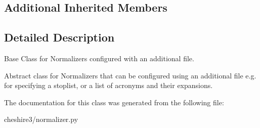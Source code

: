 \subsection*{Additional Inherited Members}


\subsection{Detailed Description}
\begin{DoxyVerb}Base Class for Normalizers configured with an additional file.

Abstract class for Normalizers that can be configured using an additional
file e.g. for specifying a stoplist, or a list of acronyms and their
expansions.
\end{DoxyVerb}
 

The documentation for this class was generated from the following file\-:\begin{DoxyCompactItemize}
\item 
cheshire3/normalizer.\-py\end{DoxyCompactItemize}
